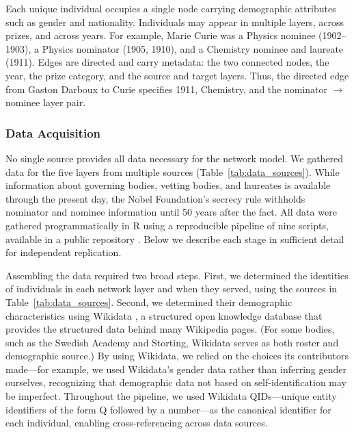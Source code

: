 \documentclass[12pt]{article}
\begin{document}
Each unique individual occupies a single node carrying demographic attributes such as gender and nationality. Individuals may appear in multiple layers, across prizes, and across years. For example, Marie Curie was a Physics nominee (1902--1903), a Physics nominator (1905, 1910), and a Chemistry nominee and laureate (1911). Edges are directed and carry metadata: the two connected nodes, the year, the prize category, and the source and target layers. Thus, the directed edge from Gaston Darboux to Curie specifies 1911, Chemistry, and the nominator $\to$ nominee layer pair.

\subsubsection*{Data Acquisition}

No single source provides all data necessary for the network model. We gathered data for the five layers from multiple sources (Table~\ref{tab:data_sources}). While information about governing bodies, vetting bodies, and laureates is available through the present day, the Nobel Foundation's secrecy rule withholds nominator and nominee information until 50 years after the fact. All data were gathered programmatically in R using a reproducible pipeline of nine scripts, available in a public repository \cite{nobelgithub}. Below we describe each stage in sufficient detail for independent replication.

Assembling the data required two broad steps. First, we determined the identities of individuals in each network layer and when they served, using the sources in Table~\ref{tab:data_sources}. Second, we determined their demographic characteristics using Wikidata \cite{wikidata}, a structured open knowledge database that provides the structured data behind many Wikipedia pages. (For some bodies, such as the Swedish Academy and Storting, Wikidata serves as both roster and demographic source.) By using Wikidata, we relied on the choices its contributors made---for example, we used Wikidata's gender data rather than inferring gender ourselves, recognizing that demographic data not based on self-identification may be imperfect. Throughout the pipeline, we used Wikidata QIDs---unique entity identifiers of the form Q followed by a number---as the canonical identifier for each individual, enabling cross-referencing across data sources.
\end{document}
